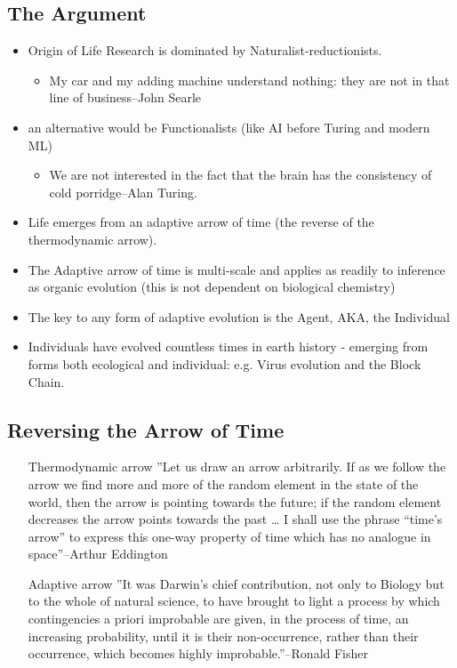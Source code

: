 \documentclass[]{article}
\begin{document}
\subsection{The Argument}

\begin{itemize}
	\item Origin of Life Research is dominated by Naturalist-reductionists.
	\begin{itemize}
		\item My car and my adding machine 	understand nothing: they are
		not in that line of business--John Searle
	\end{itemize}
	\item an alternative would be Functionalists (like AI before Turing and modern ML)
	\begin{itemize}
		\item We are not interested in the fact that the brain has the consistency of cold porridge--Alan Turing.
	\end{itemize}
	\item Life emerges from an adaptive arrow of time (the reverse of the thermodynamic arrow).
	\item The Adaptive arrow of time is multi-scale and applies as readily to inference as organic evolution (this is not dependent on biological chemistry)
	\item The key to any form of adaptive evolution is the Agent, AKA, the Individual
	\item Individuals have evolved countless times in earth history - emerging from
	forms both ecological and individual: e.g. Virus evolution and the Block Chain.
\end{itemize}

\subsection{Reversing the Arrow of Time}

\begin{itemize}
	\item[Thermodynamic arrow] ''Let us draw an arrow arbitrarily. If as we follow the arrow we find more and more
	of the random element in the state of the world, then the arrow is pointing towards
	the future; if the random element decreases the arrow points towards the past … I
	shall use the phrase “time's arrow” to express this one-way property of time which
	has no analogue in space''--Arthur Eddington\cite{eddington1939philosophy}
	
	\item[Adaptive arrow]''It was Darwin’s chief contribution, not only to Biology but to the whole of natural science, to have brought to light a process by which contingencies a priori
	improbable are given, in the process of time, an increasing probability, until it is their non-occurrence, rather than their occurrence, which becomes highly improbable.''--Ronald Fisher\cite{fisher1930genetical}
\end{itemize}
\end{document}
